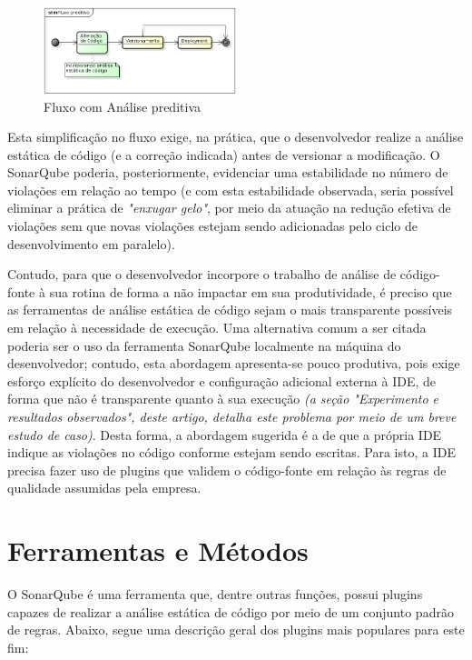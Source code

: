 \documentclass[12pt,journal,compsoc]{IEEEtran}
\begin{document}
\begin{figure}[ht!]
\centering
\includegraphics[width=0.5\textwidth]{img/flow_after}
\caption{Fluxo com Análise preditiva}
\label{flow_after}
\end{figure}

Esta simplificação no fluxo exige, na prática, que o desenvolvedor realize a análise estática de código (e a correção indicada) antes de versionar a modificação\cite{jamesshore_ci_attitude}. O SonarQube poderia, posteriormente, evidenciar uma estabilidade no número de violações em relação ao tempo (e com esta estabilidade observada, seria possível eliminar a prática de \emph{"enxugar gelo"}, por meio da atuação na redução efetiva de violações sem que novas violações estejam sendo adicionadas pelo ciclo de desenvolvimento em paralelo). 

Contudo, para que o desenvolvedor incorpore o trabalho de análise de código-fonte à sua rotina de forma a não impactar em sua produtividade, é preciso que as ferramentas de análise estática de código sejam o mais transparente possíveis em relação à necessidade de execução. Uma alternativa comum a ser citada poderia ser o uso da ferramenta SonarQube localmente na máquina do desenvolvedor; contudo, esta abordagem apresenta-se pouco produtiva, pois exige esforço explícito do desenvolvedor e configuração adicional externa à IDE, de forma que não é transparente quanto à sua execução \emph{(a seção "Experimento e resultados observados", deste artigo, detalha este problema por meio de um breve estudo de caso)}. Desta forma, a abordagem sugerida é a de que a própria IDE indique as violações no código conforme estejam sendo escritas. Para isto, a IDE precisa fazer uso de plugins que validem o código-fonte em relação às regras de qualidade assumidas pela empresa. 


\section{Ferramentas e Métodos}

O SonarQube é uma ferramenta que, dentre outras funções, possui plugins capazes de realizar a análise estática de código por meio de um conjunto padrão de regras. Abaixo, segue uma descrição geral dos plugins mais populares para este fim:
\end{document}
